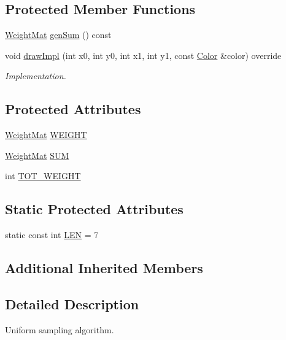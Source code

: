 \subsection*{Protected Member Functions}
\begin{DoxyCompactItemize}
\item 
\hyperlink{classDrawSampling_a73c5d308c9d35c89746810be84e6834d}{Weight\+Mat} \hyperlink{classDrawSampling_ac5f43bc9f50a57bb7226f6e971c0fd53}{gen\+Sum} () const 
\item 
void \hyperlink{classDrawSampling_a3d67fd8278cf17d4cb35958aa1a21e31}{draw\+Impl} (int x0, int y0, int x1, int y1, const \hyperlink{canvas_8h_a084a39206618848fb8bc9187d3758c87}{Color} \&color) override
\begin{DoxyCompactList}\small\item\em Implementation. \end{DoxyCompactList}\end{DoxyCompactItemize}
\subsection*{Protected Attributes}
\begin{DoxyCompactItemize}
\item 
\hyperlink{classDrawSampling_a73c5d308c9d35c89746810be84e6834d}{Weight\+Mat} \hyperlink{classDrawSampling_ac76ed88fbade57d7d259fa6bb4ddb312}{W\+E\+I\+G\+HT}
\item 
\hyperlink{classDrawSampling_a73c5d308c9d35c89746810be84e6834d}{Weight\+Mat} \hyperlink{classDrawSampling_a63072a47a8eb23f487f94418c9a27208}{S\+UM}
\item 
int \hyperlink{classDrawSampling_a8ce16ba19af34ba89f7722b7d993143c}{T\+O\+T\+\_\+\+W\+E\+I\+G\+HT}
\end{DoxyCompactItemize}
\subsection*{Static Protected Attributes}
\begin{DoxyCompactItemize}
\item 
static const int \hyperlink{classDrawSampling_a65a0b2e1d234d93049c4807d32fd009d}{L\+EN} = 7
\end{DoxyCompactItemize}
\subsection*{Additional Inherited Members}


\subsection{Detailed Description}
Uniform sampling algorithm. 

